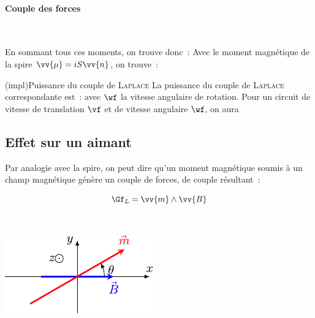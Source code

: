 \documentclass[../../main/main.tex]{subfiles}
\begin{document}
\begin{tcb*}[breakable]
	\paragraph*{Couple des forces}~
	\smallbreak
	\begin{isd}
		En sommant tous ces moments, on trouve donc~:
		\vspace{-15pt}
		\tcblower
		Avec le moment magnétique de la spire $\vv{\mu} = iS \vv{n}$, on trouve~:
		\vspace{-15pt}
	\end{isd}
\end{tcb*}

\begin{tcb*}[sidebyside](impl){Puissance du couple de \textsc{Laplace}}
	La puissance du couple de \textsc{Laplace} correspondante est~:
	\psw{%
		\[
			\boxed{
				\Pc_{L,\w}
				= \Gf_{L} \cdot \wf
			}
		\]
	}%
	avec $\wf$ la vitesse angulaire de rotation.
	\tcblower
	Pour un circuit de vitesse de translation $\vf$ et de vitesse angulaire $\wf$,
	on aura
	\psw{%
		\[
			\boxed{\Pc_L = \Ff_L \cdot \vf + \Gf_L \cdot \wf}
		\]
	}%
\end{tcb*}

\subsection{Effet sur un aimant}
\label{ssec:lplcplaim}

Par analogie avec la spire, on peut dire qu'un moment magnétique soumis à un
champ magnétique génère un couple de forces, de couple résultant~:
\smallbreak
\noindent
\begin{minipage}[t]{.5\linewidth}
	\[
		\Gf_L =  \vv{m}\wedge \vv{B}
	\]
\end{minipage}
\hfill
\begin{minipage}[t]{.5\linewidth}
	~
	\vspace*{-30pt}
	\begin{center}
		\includegraphics[scale=1]{aim_cpl}
		\label{fig:aim_cpl}
	\end{center}
\end{minipage}
\end{document}
